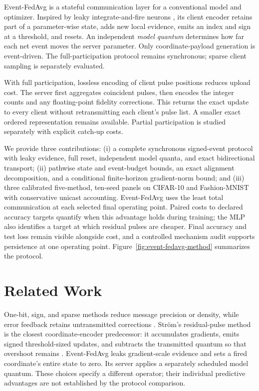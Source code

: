 \documentclass[conference]{IEEEtran}
\newcommand{\rev}[1]{#1}
\newcommand{\spacerev}[1]{#1}
\newcommand{\mOneColor}{}
\newcommand{\mOneRev}[1]{{\mOneColor #1}}
\newcommand{\coreColor}{\color{coreblue}}
\newcommand{\coreRev}[1]{{\coreColor #1}}
\newcommand{\mlpColor}{\color{mlporange}}
\newcommand{\mlpRev}[1]{{\mlpColor #1}}
\begin{document}
\spacerev{Event-FedAvg is a stateful communication layer for a conventional
model and optimizer. Inspired by leaky integrate-and-fire neurons
\cite{gerstner2014neuronal}, its client encoder retains part of a parameter-wise
state, adds new local evidence, emits an index and sign at a threshold, and
resets. An independent \emph{model quantum} determines how far each net event
moves the server parameter. Only coordinate-payload generation is event-driven.
The full-participation protocol remains synchronous; sparse client
sampling is separately evaluated.}

\coreRev{With full participation, lossless encoding of client pulse positions
reduces upload cost. The server first aggregates coincident pulses, then
encodes the integer counts and any floating-point fidelity corrections.
This returns the exact update to every client without retransmitting each
client's pulse list. A smaller exact ordered representation remains available.
Partial participation is studied separately with explicit catch-up costs.}

\mlpRev{We provide three contributions: (i) a complete synchronous signed-event
protocol with leaky evidence, full reset, independent model quanta, and exact
bidirectional transport; (ii) pathwise state and event-budget bounds, an exact
alignment decomposition, and a conditional finite-horizon gradient-norm bound;
and (iii) three calibrated five-method, ten-seed panels on CIFAR-10 and
Fashion-MNIST with conservative unicast accounting. Event-FedAvg uses the least
total communication at each selected final operating point. Paired costs to
declared accuracy targets quantify when this advantage holds during training;
the MLP also identifies a target at which residual pulses are cheaper.
Final accuracy and test loss remain visible alongside cost, and a controlled
mechanism audit supports persistence at one operating point.
Figure~\ref{fig:event-fedavg-method} summarizes the protocol.}

\section{\rev{Related Work}}
\label{sec:related-work}



\mOneRev{One-bit, sign, and sparse methods reduce message precision or density,
while error feedback retains untransmitted corrections
\cite{seide2014onebit,bernstein2018signsgd,stich2018memory,richtarik2021ef21}.
Str\"om's residual-pulse method is the closest coordinate-encoder predecessor:
it accumulates gradients, emits signed threshold-sized updates, and subtracts
the transmitted quantum so that overshoot remains
\cite{strom2015distributed}. Event-FedAvg leaks gradient-scale evidence and
sets a fired coordinate's entire state to zero. Its server applies a
separately scheduled model quantum. These choices specify a different operator;
their individual predictive advantages are not established by the protocol
comparison.}
\end{document}

